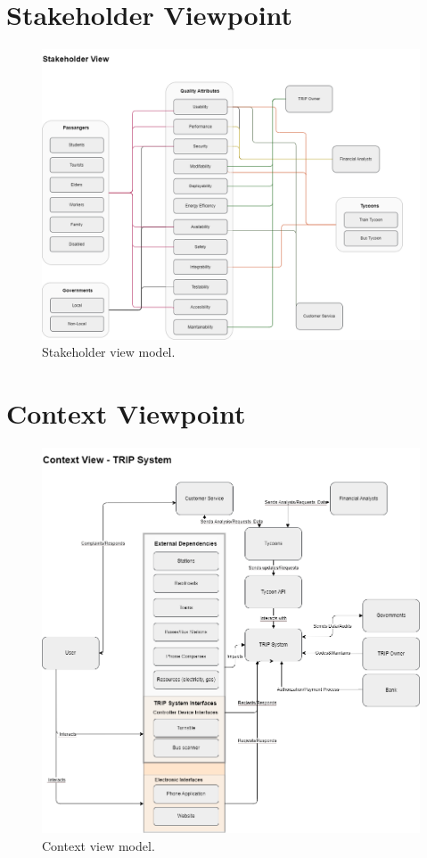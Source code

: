 \section{Stakeholder Viewpoint}
\begin{figure}[H]
    \centering
    \includegraphics[width=\textwidth]{drawings/views_draft2/stakeholder_view.png}
    \caption{Stakeholder view model.}
    \label{fig:stakeholder_view_model}
\end{figure}

\section{Context Viewpoint}

\begin{figure}[H]
    \centering
    \includegraphics[width=\textwidth]{drawings/views_draft2/context_view.png}
    \caption{Context view model.}
    \label{fig:context_view_model}
\end{figure}

